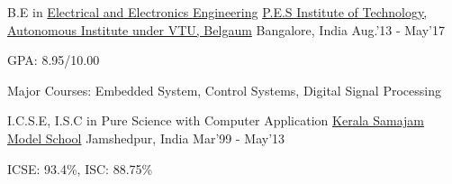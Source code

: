 \begin{cventries}
	\cventry
	{B.E in \href{https://eee.pes.edu/}{Electrical and Electronics Engineering}}
	{\href{https://pesit.pes.edu/}{P.E.S Institute of Technology, Autonomous Institute under VTU, Belgaum}}
	{Bangalore, India}
	{Aug.'13 - May'17}
	{
		\begin{cvitems}
		\item{GPA: 8.95/10.00}
		\item{Major Courses: Embedded System, Control Systems, Digital Signal Processing}
		\end{cvitems}
	}
\end{cventries}
\begin{cventries}
	\cventry
	{I.C.S.E, I.S.C in {Pure Science with Computer Application}}
	{\href{https://ksms.ac.in/}{Kerala Samajam Model School}}
	{Jamshedpur, India}
	{Mar'99 - May'13}
	{
		\begin{cvitems}
		\item{ICSE: 93.4\%, ISC: 88.75\%}
		\end{cvitems}
	}
\end{cventries}
